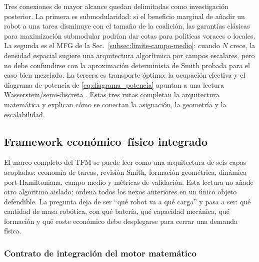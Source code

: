 Tres conexiones de mayor alcance quedan delimitadas como investigación posterior. La
primera es submodularidad: si el beneficio marginal de añadir un robot a una tarea
disminuye con el tamaño de la coalición, las garantías clásicas para maximización
submodular \citep{fisher1978submodular} podrían dar cotas para políticas voraces o
locales. La segunda es el MFG de la Sec.~\ref{subsec:limite-campo-medio}: cuando $N$
crece, la densidad espacial sugiere una arquitectura algorítmica por campos escalares,
pero no debe confundirse con la aproximación determinista de Smith probada para el caso
bien mezclado. La tercera es transporte óptimo:
la ocupación
efectiva y el diagrama de potencia de \eqref{eq:diagrama_potencia} apuntan a una
lectura Wasserstein/semi-discreta \citep{villani2009optimal}. Estas tres rutas completan
la arquitectura matemática y explican cómo se conectan la asignación, la geometría y la
escalabilidad.

\subsection{Framework económico--físico integrado}
\label{subsec:framework-integrado}

El marco completo del TFM se puede leer como una arquitectura de seis capas
acopladas: economía de tareas, revisión Smith, formación geométrica, dinámica
port-Hamiltoniana, campo medio y métricas de validación. Esta lectura no añade otro
algoritmo aislado; ordena todos los nexos anteriores en un único objeto defendible. La
pregunta deja de ser ``qué robot va a qué carga'' y pasa a ser: qué cantidad de masa
robótica, con qué batería, qué capacidad mecánica, qué formación y qué coste económico
debe desplegarse para cerrar una demanda física.



\subsubsection{Contrato de integración del motor matemático}
\label{subsubsec:contrato-motor-integrado}

